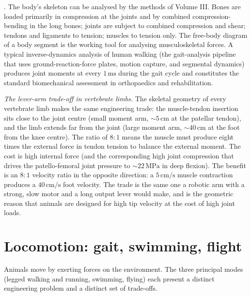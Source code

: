 . The body's
skeleton can be analysed by the methods of Volume III. Bones are
loaded primarily in compression at the joints and by combined
compression-bending in the long bones; joints are subject to combined
compression and shear; tendons and ligaments to tension; muscles to
tension only. The free-body diagram of a body segment is the working
tool for analysing musculoskeletal forces. A typical inverse-dynamics
analysis of human walking (the gait-analysis pipeline that uses
ground-reaction-force plates, motion capture, and segmental dynamics)
produces joint moments at every $1\,\text{ms}$ during the gait cycle
and constitutes the standard biomechanical assessment in orthopaedics
and rehabilitation.

\begin{mastery}
\textit{The lever-arm trade-off in vertebrate limbs.} The skeletal
geometry of every vertebrate limb makes the same engineering trade:
the muscle-tendon insertion sits close to the joint centre
(small moment arm, $\sim 5\,\text{cm}$ at the patellar tendon), and
the limb extends far from the joint (large moment arm,
$\sim 40\,\text{cm}$ at the foot from the knee centre). The ratio of
$8{:}1$ means the muscle must produce eight times the external force
in tendon tension to balance the external moment. The cost is high
internal force (and the corresponding high joint compression that
drives the patello-femoral joint pressure to $\sim 22\,\text{MPa}$ in
deep flexion). The benefit is an $8{:}1$ velocity ratio in the
opposite direction: a $5\,\text{cm/s}$ muscle contraction produces a
$40\,\text{cm/s}$ foot velocity. The trade is the same one a robotic
arm with a strong, slow motor and a long output lever would make,
and is the geometric reason that animals are designed for high tip
velocity at the cost of high joint loads.
\end{mastery}

\section{Locomotion: gait, swimming, flight}

Animals move by exerting forces on the environment. The three
principal modes (legged walking and running, swimming, flying) each
present a distinct engineering problem and a distinct set of
trade-offs.


